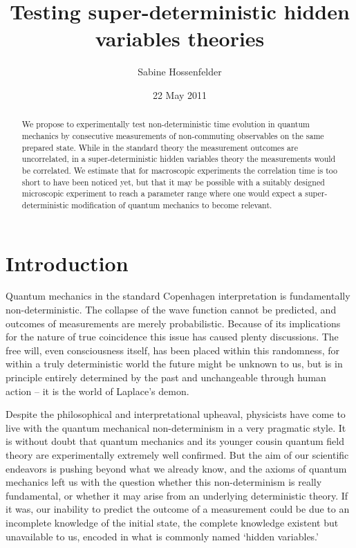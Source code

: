 \documentclass[12pt]{article}                    %
\begin{document}
\title{Testing super-deterministic hidden variables theories}
\date{22 May 2011}


\author{Sabine Hossenfelder }



\maketitle

\begin{abstract}
We propose to experimentally test non-deterministic time evolution in quantum
mechanics by consecutive measurements of non-commuting observables
on the same prepared state. While in the standard theory the measurement
outcomes are uncorrelated, in a
super-deterministic hidden variables theory the measurements would
be correlated. We estimate that for macroscopic experiments the
correlation time is too short to have been noticed yet, but that
it may be possible with a suitably designed microscopic experiment 
to reach a parameter range where one would expect a super-deterministic
modification of quantum mechanics to become relevant. 

\end{abstract}

\section{Introduction}

Quantum mechanics in the standard Copenhagen 
interpretation is fundamentally non-deterministic. The collapse of the wave function 
cannot be predicted, and outcomes 
of measurements are merely probabilistic. Because of its implications for 
the nature of true coincidence this issue has caused plenty discussions. The 
free will, even consciousness itself, has been placed within this 
randomness, for within a truly deterministic world the future might be unknown 
to us, but is in principle entirely determined by the past and unchangeable through 
human action -- it is the world of Laplace's demon. 

Despite the philosophical and interpretational upheaval, physicists 
have come to live with the quantum mechanical non-determinism in a very pragmatic style. 
It is without doubt that quantum mechanics and its younger cousin quantum 
field theory are experimentally extremely well confirmed. But the aim of our 
scientific endeavors is pushing beyond what we already know, and the axioms of quantum mechanics 
left us with the question whether this non-determinism is really fundamental, 
or whether it may arise from an underlying deterministic theory. If it was,
our inability to predict the outcome of a measurement could be due to an incomplete 
knowledge of the initial state, the complete knowledge existent but unavailable 
to us, encoded in what is commonly named `hidden variables.'
\end{document}
